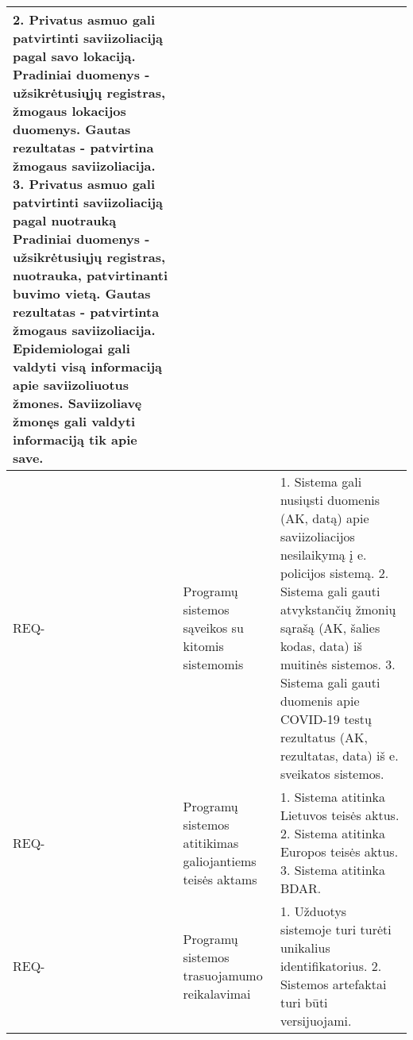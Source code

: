 \documentclass{VUMIFPSkursinis}
\newcounter{counter}
\newcommand{\reqCode}{%
	 \stepcounter{counter}%
	\color{blue} REQ-\thecounter}
\begin{document}
\begin{center}
\begin{longtable}{|C{2cm}|L{5cm}|L{8cm}|}
		{\color{blue} 2. Privatus asmuo gali patvirtinti saviizoliaciją pagal savo lokaciją}. \textbf{Pradiniai duomenys} - užsikrėtusiųjų registras, žmogaus lokacijos duomenys. \textbf{Gautas rezultatas} - {\color{blue} patvirtina} žmogaus saviizoliacija.
		{\color{blue} 3. Privatus asmuo gali patvirtinti saviizoliaciją pagal nuotrauką \textbf{Pradiniai duomenys} - užsikrėtusiųjų registras, nuotrauka, patvirtinanti buvimo vietą. \textbf{Gautas rezultatas} - patvirtinta žmogaus saviizoliacija}.
		Epidemiologai gali valdyti visą informaciją apie saviizoliuotus žmones. Saviizoliavę žmonęs gali valdyti informaciją tik apie save.
		\\ \hline
		\reqCode                                                          &
		Programų sistemos sąveikos su kitomis sistemomis                  &
		{\color{blue} 1. Sistema gali nusiųsti duomenis (AK, datą) apie saviizoliacijos nesilaikymą į} e. policijos sistemą.
		{\color{blue} 2. Sistema gali gauti atvykstančių žmonių sąrašą (AK, šalies kodas, data) iš} muitinės sistemos.
		{\color{blue} 3. Sistema gali gauti duomenis apie COVID-19 testų rezultatus (AK, rezultatas, data) iš} e. sveikatos sistemos.
		\\ \hline
		\reqCode                                                          &
		Programų sistemos atitikimas galiojantiems teisės aktams          &
		{\color{blue} 1.} Sistema atitinka Lietuvos teisės aktus.
		{\color{blue} 2.} Sistema atitinka Europos teisės aktus.
		{\color{blue} 3.} Sistema atitinka BDAR.                                                                                                                                                                                                                                                                                                                                                                                                                                                                                                                                                                                                                                                                                                                                                              \\ \hline
		\reqCode                                                          &
		Programų sistemos trasuojamumo reikalavimai                       &
		{\color{blue} 1.} Užduotys sistemoje turi turėti unikalius identifikatorius.                                  
		{\color{blue} 2. Sistemos artefaktai turi būti versijuojami. }                                  

\end{longtable}
\end{center}
\end{document}
